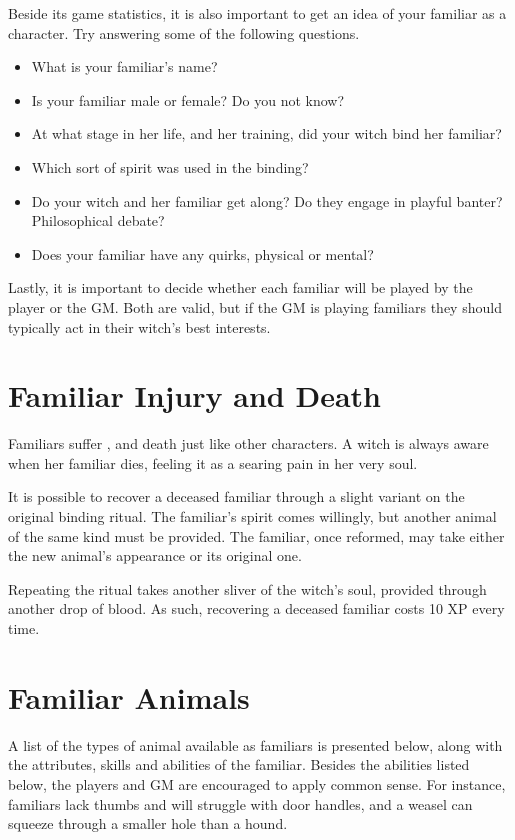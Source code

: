 Beside its game statistics, it is also important to get an idea of your familiar as a character.
Try answering some of the following questions.

\begin{itemize}
	\item What is your familiar's name?
	\item Is your familiar male or female?
		Do you not know?
	\item At what stage in her life, and her training, did your witch bind her familiar?
	\item Which sort of spirit was used in the binding? %
	\item Do your witch and her familiar get along?
		Do they engage in playful banter?
		Philosophical debate?
	\item Does your familiar have any quirks, physical or mental?
\end{itemize}

Lastly, it is important to decide whether each familiar will be played by the player or the GM.
Both are valid, but if the GM is playing familiars they should typically act in their witch's best interests.

\section{Familiar Injury and Death}

Familiars suffer {\damage}, {\shock} and death just like other characters.
A witch is always aware when her familiar dies, feeling it as a searing pain in her very soul.

It is possible to recover a deceased familiar through a slight variant on the original binding ritual.
The familiar's spirit comes willingly, but another animal of the same kind must be provided.
The familiar, once reformed, may take either the new animal's appearance or its original one.

Repeating the ritual takes another sliver of the witch's soul, provided through another drop of blood.
As such, recovering a deceased familiar costs 10 XP every time.

\section{Familiar Animals}

A list of the types of animal available as familiars is presented below, along with the attributes, skills and abilities of the familiar.
Besides the abilities listed below, the players and GM are encouraged to apply common sense.
For instance, familiars lack thumbs and will struggle with door handles, and a weasel can squeeze through a smaller hole than a hound.


